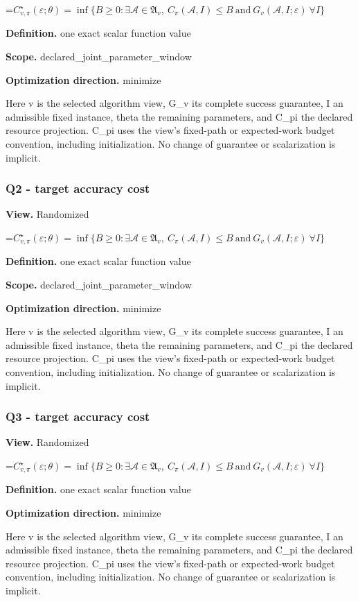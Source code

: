 \documentclass[10pt,a4paper]{article}
\newcommand{\AtlasMath}[1]{\par\begingroup\centering\setbox0=\hbox{$\displaystyle #1$}\ifdim\wd0>1.4\linewidth\typeout{ATLAS WIDE FORMULA: \the\wd0}\fi\ifdim\wd0>\linewidth\resizebox{\linewidth}{!}{\box0}\else\box0\fi\par\endgroup}
\begin{document}
\AtlasMath{C^\star_{v,\pi}(\varepsilon;\theta)=\inf\{B\ge0:\exists\mathcal A\in\mathfrak A_v,\ C_\pi(\mathcal A,I)\le B\ \text{and}\ G_v(\mathcal A,I;\varepsilon)\ \forall I\}}
\textbf{Definition.} one exact scalar function value

\textbf{Scope.} declared\_joint\_parameter\_window

\textbf{Optimization direction.} minimize

Here v is the selected algorithm view, G\_v its complete success guarantee, I an admissible fixed instance, theta the remaining parameters, and C\_pi the declared resource projection. C\_pi uses the view's fixed-path or expected-work budget convention, including initialization. No change of guarantee or scalarization is implicit.

\subsubsection{Q2 - target accuracy cost}
\textbf{View.} Randomized

\AtlasMath{C^\star_{v,\pi}(\varepsilon;\theta)=\inf\{B\ge0:\exists\mathcal A\in\mathfrak A_v,\ C_\pi(\mathcal A,I)\le B\ \text{and}\ G_v(\mathcal A,I;\varepsilon)\ \forall I\}}
\textbf{Definition.} one exact scalar function value

\textbf{Scope.} declared\_joint\_parameter\_window

\textbf{Optimization direction.} minimize

Here v is the selected algorithm view, G\_v its complete success guarantee, I an admissible fixed instance, theta the remaining parameters, and C\_pi the declared resource projection. C\_pi uses the view's fixed-path or expected-work budget convention, including initialization. No change of guarantee or scalarization is implicit.

\subsubsection{Q3 - target accuracy cost}
\textbf{View.} Randomized

\AtlasMath{C^\star_{v,\pi}(\varepsilon;\theta)=\inf\{B\ge0:\exists\mathcal A\in\mathfrak A_v,\ C_\pi(\mathcal A,I)\le B\ \text{and}\ G_v(\mathcal A,I;\varepsilon)\ \forall I\}}
\textbf{Definition.} one exact scalar function value

\textbf{Optimization direction.} minimize

Here v is the selected algorithm view, G\_v its complete success guarantee, I an admissible fixed instance, theta the remaining parameters, and C\_pi the declared resource projection. C\_pi uses the view's fixed-path or expected-work budget convention, including initialization. No change of guarantee or scalarization is implicit.
\end{document}
